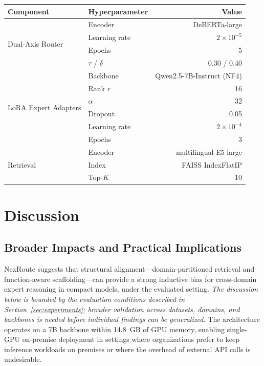 \documentclass[a4paper,fleql,doubleblind]{cas-sc}
\begin{document}
\vspace{6pt plus 4pt minus 3pt}
\begin{center}
\begingroup
{}
\label{tab:hyperparams_all}
\begin{tabular}{llr}
\toprule
\textbf{Component} & \textbf{Hyperparameter} & \textbf{Value} \\
\midrule
\multirow{4}{*}{Dual-Axis Router}
  & Encoder           & DeBERTa-large \\
  & Learning rate     & $2 \times 10^{-5}$ \\
  & Epochs            & 5 \\
  & $\tau$ / $\delta$ & 0.30 / 0.40 \\
\midrule
\multirow{6}{*}{LoRA Expert Adapters}
  & Backbone        & Qwen2.5-7B-Instruct (NF4) \\
  & Rank $r$        & 16 \\
  & $\alpha$        & 32 \\
  & Dropout         & 0.05 \\
  & Learning rate   & $2 \times 10^{-4}$ \\
  & Epochs          & 3 \\
\midrule
\multirow{3}{*}{Retrieval}
  & Encoder  & multilingual-E5-large \\
  & Index    & FAISS IndexFlatIP \\
  & Top-$K$  & 10 \\
\bottomrule
\end{tabular}
\endgroup
\end{center}
\vspace{6pt plus 4pt minus 3pt}

\section{Discussion}
\label{sec:discussion}

\subsection{Broader Impacts and Practical Implications}
NexRoute suggests that structural alignment---domain-partitioned retrieval
and function-aware scaffolding---can provide a strong inductive bias for
cross-domain expert reasoning in compact models, under the evaluated setting. \emph{The discussion below is
bounded by the evaluation conditions described in Section~\ref{sec:experiments};
broader validation across datasets, domains, and backbones is needed before
individual findings can be generalized.} The architecture operates on a 7B backbone within 14.8~GB of GPU memory,
enabling single-GPU on-premise deployment in settings where organizations
prefer to keep inference workloads on premises or where the overhead of
external API calls is undesirable.
\end{document}
